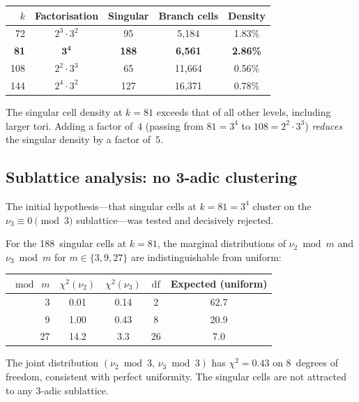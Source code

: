 \documentclass[11pt,a4paper]{article}
\theoremstyle{plain}
\theoremstyle{definition}
\begin{document}
\begin{empirical}\label{obs:singular-density}
    \begin{center}
    \renewcommand{\arraystretch}{1.15}
    \begin{tabular}{rcccc}
        \toprule
        $k$ & Factorisation & Singular & Branch cells & Density \\
        \midrule
        72 & $2^3 \cdot 3^2$ & 95 & 5{,}184 & 1.83\% \\
        \textbf{81} & $\mathbf{3^4}$ & \textbf{188} & \textbf{6{,}561} & \textbf{2.86\%} \\
        108 & $2^2 \cdot 3^3$ & 65 & 11{,}664 & 0.56\% \\
        144 & $2^4 \cdot 3^2$ & 127 & 16{,}371 & 0.78\% \\
        \bottomrule
    \end{tabular}
    \end{center}
    The singular cell density at $k = 81$ exceeds that of all other levels,
    including larger tori.  Adding a factor of~$4$ (passing from
    $81 = 3^4$ to $108 = 2^2 \cdot 3^3$) \emph{reduces} the singular
    density by a factor of~$5$.
\end{empirical}


\subsection{Sublattice analysis: no 3-adic clustering}

The initial hypothesis---that singular cells at $k = 81 = 3^4$
cluster on the $\nu_3 \equiv 0 \pmod{3}$ sublattice---was tested
and decisively rejected.

\begin{empirical}\label{obs:sublattice}
    For the 188~singular cells at $k = 81$, the marginal distributions
    of $\nu_2 \bmod m$ and $\nu_3 \bmod m$ for $m \in \{3, 9, 27\}$
    are indistinguishable from uniform:
    \begin{center}
    \renewcommand{\arraystretch}{1.15}
    \begin{tabular}{rcccc}
        \toprule
        $\bmod\; m$ & $\chi^2(\nu_2)$ & $\chi^2(\nu_3)$ & $\mathrm{df}$ & Expected (uniform) \\
        \midrule
        3 & 0.01 & 0.14 & 2 & 62.7 \\
        9 & 1.00 & 0.43 & 8 & 20.9 \\
        27 & 14.2 & 3.3 & 26 & 7.0 \\
        \bottomrule
    \end{tabular}
    \end{center}
    The joint distribution $(\nu_2 \bmod 3,\, \nu_3 \bmod 3)$ has
    $\chi^2 = 0.43$ on 8~degrees of freedom, consistent with perfect
    uniformity.  The singular cells are not attracted to any 3-adic
    sublattice.
\end{empirical}
\end{document}
